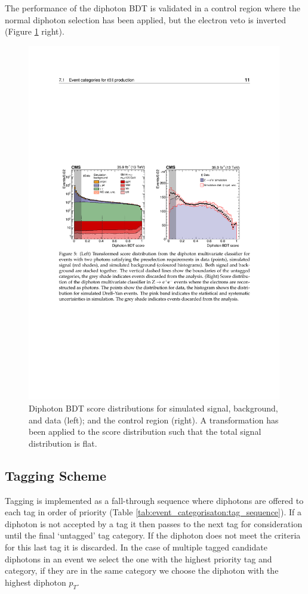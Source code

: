 The performance of the diphoton BDT is validated in a \Zee control region where the normal diphoton selection has been applied, but the electron veto is inverted (Figure \ref{fig:event_categorisaton:diphoton_bdt} right). 
\begin{figure}[h!]
    \begin{center}
        \includegraphics[width=0.99\textwidth]{figures/event_selection/diphoton_BDT.pdf}
    \end{center}
    \caption{Diphoton BDT score distributions for simulated signal, background, and data (left); and the \Zee control region (right). 
             A transformation has been applied to the score distribution such that the total signal distribution is flat.}
        \label{fig:event_categorisaton:diphoton_bdt}
\end{figure}


\subsection{Tagging Scheme}
Tagging is implemented as a fall-through sequence where diphotons are offered to each tag in order of priority (Table \ref{tab:event_categorisaton:tag_sequence}). 
If a diphoton is not accepted by a tag it then passes to the next tag for consideration until the final `untagged' tag category. 
If the diphoton does not meet the criteria for this last tag it is discarded.
In the case of multiple tagged candidate diphotons in an event we select the one with the highest priority tag and category, if they are in the same category we choose the diphoton with the highest diphoton $p_{T}$.

